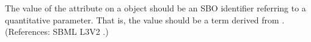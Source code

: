 The value of the attribute  on a \Parameter object should be
an SBO identifier referring to a quantitative parameter.  That is, the
value should be a term derived from \sboparameter.  (References: SBML
 L3V2 .)
